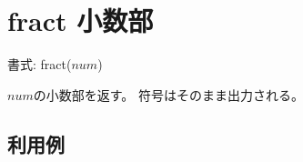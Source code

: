 
%

\section{fract 小数部\label{sect:fract}}

書式: fract($num$)

$num$の小数部を返す。
符号はそのまま出力される。

\subsection*{利用例}


%

